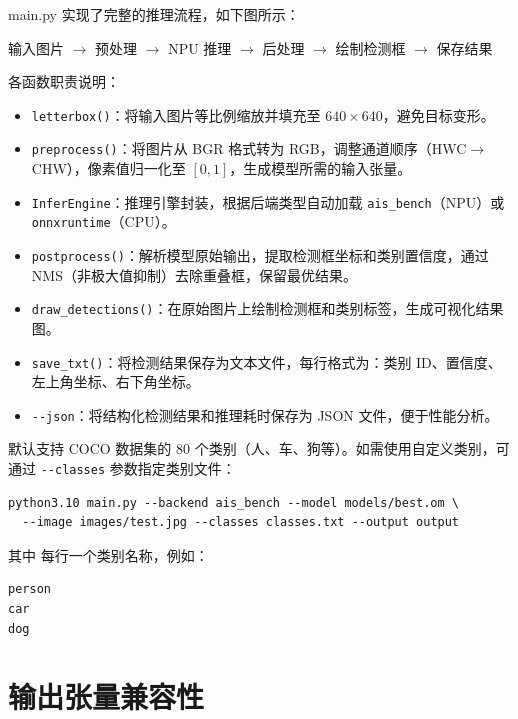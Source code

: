 main.py 实现了完整的推理流程，如下图所示：

\begin{center}
输入图片 $\rightarrow$ 预处理 $\rightarrow$ NPU 推理 $\rightarrow$ 后处理 $\rightarrow$ 绘制检测框 $\rightarrow$ 保存结果
\end{center}

各函数职责说明：

\begin{itemize}
  \item \texttt{letterbox()}：将输入图片等比例缩放并填充至 $640\times640$，避免目标变形。
  \item \texttt{preprocess()}：将图片从 BGR 格式转为 RGB，调整通道顺序（HWC$\rightarrow$CHW），像素值归一化至 $[0,1]$，生成模型所需的输入张量。
  \item \texttt{InferEngine}：推理引擎封装，根据后端类型自动加载 \texttt{ais\_bench}（NPU）或 \texttt{onnxruntime}（CPU）。
  \item \texttt{postprocess()}：解析模型原始输出，提取检测框坐标和类别置信度，通过 NMS（非极大值抑制）去除重叠框，保留最优结果。
  \item \texttt{draw\_detections()}：在原始图片上绘制检测框和类别标签，生成可视化结果图。
  \item \texttt{save\_txt()}：将检测结果保存为文本文件，每行格式为：类别 ID、置信度、左上角坐标、右下角坐标。
  \item \texttt{-{}-json}：将结构化检测结果和推理耗时保存为 JSON 文件，便于性能分析。
\end{itemize}

默认支持 COCO 数据集的 80 个类别（人、车、狗等）。如需使用自定义类别，可通过 \texttt{-{}-classes} 参数指定类别文件：

\begin{lstlisting}[style=shell, caption={指定自定义类别}]
python3.10 main.py --backend ais_bench --model models/best.om \
  --image images/test.jpg --classes classes.txt --output output
\end{lstlisting}

\noindent 其中  每行一个类别名称，例如：

\begin{lstlisting}[caption={classes.txt 示例}]
person
car
dog
\end{lstlisting}


\section{输出张量兼容性}

